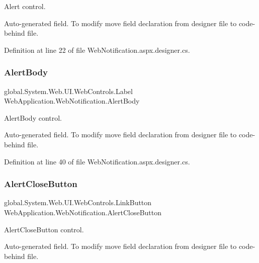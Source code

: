 Alert control. 

Auto-\/generated field. To modify move field declaration from designer file to code-\/behind file. 

Definition at line 22 of file Web\+Notification.\+aspx.\+designer.\+cs.

\mbox{\label{classWebApplication_1_1WebNotification_a10b7a855fc86a7997656b31a043493ef}} 
\subsubsection{\texorpdfstring{AlertBody}{AlertBody}}
{\footnotesize\ttfamily global.\+System.\+Web.\+U\+I.\+Web\+Controls.\+Label Web\+Application.\+Web\+Notification.\+Alert\+Body\hspace{0.3cm}{\ttfamily [protected]}}



Alert\+Body control. 

Auto-\/generated field. To modify move field declaration from designer file to code-\/behind file. 

Definition at line 40 of file Web\+Notification.\+aspx.\+designer.\+cs.

\mbox{\label{classWebApplication_1_1WebNotification_a6d7bed1a8177347a50418856a6e39a66}} 
\subsubsection{\texorpdfstring{AlertCloseButton}{AlertCloseButton}}
{\footnotesize\ttfamily global.\+System.\+Web.\+U\+I.\+Web\+Controls.\+Link\+Button Web\+Application.\+Web\+Notification.\+Alert\+Close\+Button\hspace{0.3cm}{\ttfamily [protected]}}



Alert\+Close\+Button control. 

Auto-\/generated field. To modify move field declaration from designer file to code-\/behind file. 

